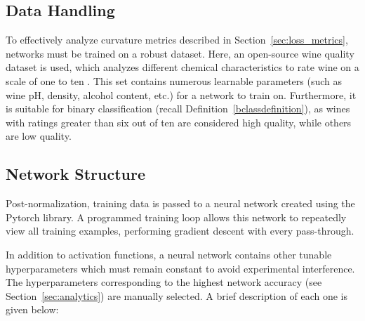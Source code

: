 \documentclass{article}
\theoremstyle{definition}
\begin{document}
\subsection{Data Handling}
\label{sec:netdata}
To effectively analyze curvature metrics described in Section~\ref{sec:loss_metrics}, networks must be trained on a robust dataset. Here, an open-source wine quality dataset is used, which analyzes different chemical characteristics to rate wine on a scale of one to ten \cite{wine_quality_186}. This set contains numerous learnable parameters (such as wine pH, density, alcohol content, etc.) for a network to train on. Furthermore, it is suitable for binary classification (recall Definition~\ref{bclassdefinition}), as wines with ratings greater than six out of ten are considered high quality, while others are low quality.


\subsection{Network Structure}
Post-normalization, training data is passed to a neural network created using the Pytorch library. A programmed training loop allows this network to repeatedly view all training examples, performing gradient descent with every pass-through.

In addition to activation functions, a neural network contains other tunable hyperparameters which must remain constant to avoid experimental interference. The hyperparameters corresponding to the highest network accuracy (see Section~\ref{sec:analytics}) are manually selected. A brief description of each one is given below:
\end{document}
